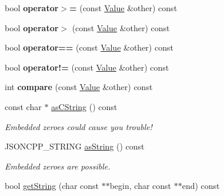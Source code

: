 \begin{DoxyCompactItemize}
\item 
\mbox{\label{classJson_1_1Value_afe2c3e52df60b9622cbd8358b74bdbf5}} 
bool {\bfseries operator$>$=} (const \hyperlink{classJson_1_1Value}{Value} \&other) const
\item 
\mbox{\label{classJson_1_1Value_a4646c2f0764908c0972160c7c2ebe567}} 
bool {\bfseries operator$>$} (const \hyperlink{classJson_1_1Value}{Value} \&other) const
\item 
\mbox{\label{classJson_1_1Value_a16f9250e30d5c4505cd11137c564a764}} 
bool {\bfseries operator==} (const \hyperlink{classJson_1_1Value}{Value} \&other) const
\item 
\mbox{\label{classJson_1_1Value_a86e95be072e515c48abc61dec63a1689}} 
bool {\bfseries operator!=} (const \hyperlink{classJson_1_1Value}{Value} \&other) const
\item 
\mbox{\label{classJson_1_1Value_aefa4464ca1bb0bcc9a87b38ed62ca2e0}} 
int {\bfseries compare} (const \hyperlink{classJson_1_1Value}{Value} \&other) const
\item 
\mbox{\label{classJson_1_1Value_a16668c8db7ef0a5de040012f0dfd84b0}} 
const char $\ast$ \hyperlink{classJson_1_1Value_a16668c8db7ef0a5de040012f0dfd84b0}{as\+C\+String} () const
\begin{DoxyCompactList}\small\item\em Embedded zeroes could cause you trouble! \end{DoxyCompactList}\item 
\mbox{\label{classJson_1_1Value_ae3f9b0d38f820ccdd8888aa92ea6e792}} 
J\+S\+O\+N\+C\+P\+P\+\_\+\+S\+T\+R\+I\+NG \hyperlink{classJson_1_1Value_ae3f9b0d38f820ccdd8888aa92ea6e792}{as\+String} () const
\begin{DoxyCompactList}\small\item\em Embedded zeroes are possible. \end{DoxyCompactList}\item 
bool \hyperlink{classJson_1_1Value_a2e1b7be6bde2fe23f15290d9ddbbdf8a}{get\+String} (char const $\ast$$\ast$begin, char const $\ast$$\ast$end) const
\item 

\end{DoxyCompactItemize}
